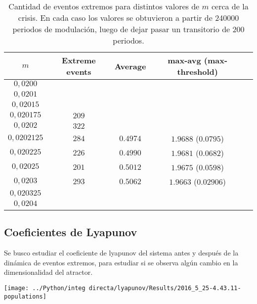 		\begin{center}
			\begin{table}[htp]
				\begin{tabular}{|c|c|c|c|c|}
					\hline
					$m$  		& 	       Extreme events \Ts \Bs  	& 	Average 	&    max-avg (max-threshold)         \\ \hline
					$0,0200$	&        		  	& &				  \\ \hline
					$0,0201$	&        			& &				  \\ \hline
					$0,02015$	&        			& &				  \\ \hline
					$0,020175$	&        		$209$  & &					  \\ \hline
					$0,0202$	&        		$322$	& & 				  \\ \hline
					$0,0202125$	&        		$284$				& $0.4974$		&	$1.9688$ ($0.0795$)	  \\ \hline					  								  
					$0,020225$	&        		$226$				& $0.4990$		&	$1.9681$ ($0.0682 $) \\ \hline					  								  
					$0,02025$	&        		$201$				& $0.5012$ 		&   $1.9675$ ($0.0598$)  \\ \hline					 
					$0,0203$    &        		$293$			&  $0.5062 $ &	$1.9663$ ($0.02906$)	  \\ \hline
					$0,020325$  &        						& &	  \\ \hline
					$0,0204$    &        						   & &  	  \\ \hline
				\end{tabular}
				\caption{Cantidad de eventos extremos para distintos valores de $m$ cerca de la crisis. En cada caso los valores se obtuvieron a partir de 240000 periodos de modulación, luego de dejar pasar un transitorio de 200 periodos. }
				\label{tab: more extreme events}
			\end{table}
		\end{center}
	
	\subsection{Coeficientes de Lyapunov}
	
	Se busco estudiar el coeficiente de lyapunov del sistema antes y después de la dinámica de eventos extremos, para estudiar si se observa algún cambio en la dimensionalidad del atractor.


	\begin{center}
			\texttt{[image: ../Python/integ directa/lyapunov/Results/2016\_5\_25-4.43.11-populations]}
	\end{center}	

